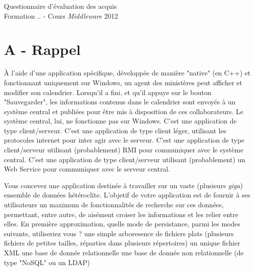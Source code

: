 \documentclass[a4paper,10pt]{article}
\begin{document}
\begin{center}
  \begin{Large}
    Questionnaire d'évaluation des acquis\\
    Formation .. - Cours \textit{Middleware} 2012
  \end{Large}
\end{center}

\section{A - Rappel}

\begin{question}{À l'aide d'une application spécifique, développée de manière "native" (en C++)
et fonctionnant uniquement sur Windows, un agent des ministères peut afficher et modifier son
calendrier. Lorsqu'il a fini, et qu'il appuye sur le bouton "Sauvegarder", les informations contenus
dans le calendrier sont envoyés à un système central et publiées pour être mis à disposition de ces
collaborateurs. Le système central, lui, ne fonctionne pas sur Windows.}
  \true C'est une application de type client/serveur.
  \false C'est une application de type client léger, utilisant les protocoles internet pour inter
  agir avec le serveur.
  \false C'est une application de type client/serveur utilisant (probablement) RMI pour communiquer
  avec le système central.
  \false C'est une application de type client/serveur utilisant (probablement) un Web Service pour
  communiquer avec le serveur central.
\end{question}

\begin{question}{Vous concevez une application destinée à travailler sur un vaste (plusieurs
\textit{giga}) ensemble de données hétéroclite. L'objetif de votre application est de fournir à ses
utilisateurs un maximum de fonctionnalités de recherche sur ces données, permettant, entre autre, de
aisément croiser les informations et les relier entre elles. En première approximation, quelle mode
de persistance, parmi les modes suivants, utiliseriez vous ?}
  \false une simple arboresence de fichiers plats (plusieurs fichiers de petites tailles, réparties
  dans plusieurs répertoires)
  \false un unique fichier XML
  \true une base de donnée relationnelle
  \true une base de donnée non relationnelle (de type "NoSQL" ou un LDAP)
\end{question}
\end{document}
